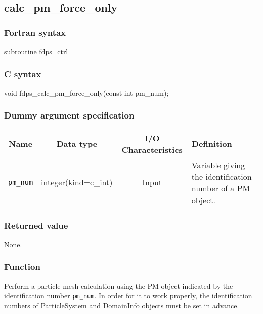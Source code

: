 \clearpage

\subsection{calc\_pm\_force\_only}
\subsubsection*{Fortran syntax}
\begin{screen}
\begin{spverbatim}
subroutine fdps_ctrl%
\end{spverbatim}
\end{screen}

\subsubsection*{C syntax}
\begin{screen}
\begin{spverbatim}
void fdps_calc_pm_force_only(const int pm_num);
\end{spverbatim}
\end{screen}

\subsubsection*{Dummy argument specification}
\begin{table}[h]
\begin{tabularx}{\linewidth}{cccX}
\toprule
\rowcolor{Snow2}
Name & Data type & I/O Characteristics & Definition \\
\midrule
\texttt{pm\_num} & integer(kind=c\_int) & Input & Variable giving the identification number of a PM object.\\
\bottomrule
\end{tabularx}
\end{table}


\subsubsection*{Returned value}
None.

\subsubsection*{Function}
Perform a particle mesh calculation using the PM object indicated by the identification number \texttt{pm\_num}. In order for it to work properly, the identification numbers of ParticleSystem and DomainInfo objects must be set in advance.
\clearpage

